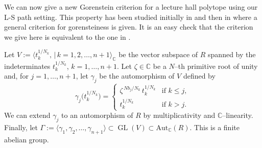 \documentclass[12pt, a4paper]{amsart}   	%
\numberwithin{equation}{section}
\theoremstyle{plain}
\theoremstyle{definition}
\DeclareMathOperator{\GL}{GL}
\newcommand{\CC}{\mathbb{C}}
\begin{document}
We can now give a new Gorenstein criterion for a lecture hall polytope using our L-S path setting. This property has been studied initially in \cite{HibiOlsenTsuchiya} and then in \cite{BrandenSolus} where a general criterion for gorensteiness is given. It is an easy check that the criterion we give here is equivalent to the one in \cite{BrandenSolus}.

Let $ V := \langle t_k^{1/N_k},\, | \, k = 1, 2,\ldots,n+1\rangle_\CC$ be the vector subspace of $R$ spanned by the indeterminates $t_k^{1/N_k}$, $k = 1, \ldots, n+1$. Let $\zeta\in\CC$ be a $N$--th primitive root of unity and, for $j = 1,\ldots,n+1$, let $\gamma_j$ be the automorphism of $V$ defined by 
\[
\gamma_j\big(t_k^{1/N_k}\big) = \begin{cases} \zeta^{\,Nb_j/N_k}\, t_k^{1/N_k} & \textrm{if }k\leq j,\\[0.5cm] t_k^{1/N_k} & \textrm{if }k>j.\end{cases}
\]
We can extend $\gamma_j$ to an automorphism of $R$ by multiplicativity and $\CC$--linearity. Finally, let $\Gamma := \langle \gamma_1,\gamma_2,\dots,\gamma_{n+1}\rangle \subset \GL( V)\subset \mathrm{Aut}_\CC( R)$. This is a finite abelian group.
\end{document}
